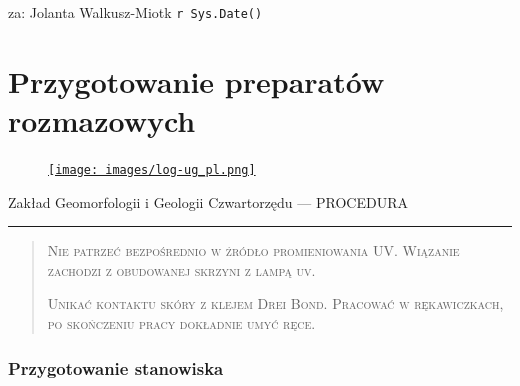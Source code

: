 \documentclass[
  letterpaper,
  DIV=11,
  numbers=noendperiod]{scrreprt}
\begin{document}
za: Jolanta Walkusz-Miotk \texttt{r\ Sys.Date()}

\hypertarget{przygotowanie-preparatuxf3w-rozmazowych}{%
\chapter{Przygotowanie preparatów
rozmazowych}\label{przygotowanie-preparatuxf3w-rozmazowych}}

\begin{figure}

\href{https://geomorfologia.ug.edu.pl}{\texttt{[image: images/log-ug\_pl.png]}}

\end{figure}

Zakład Geomorfologii i Geologii Czwartorzędu --- PROCEDURA

\begin{center}\rule{0.5\linewidth}{0.5pt}\end{center}

\begin{quote}
\textsc{Nie patrzeć bezpośrednio w źródło promieniowania UV. Wiązanie
zachodzi z obudowanej skrzyni z lampą uv.}

\textsc{Unikać kontaktu skóry z klejem Drei Bond. Pracować w
rękawiczkach, po skończeniu pracy dokładnie umyć ręce.}
\end{quote}

\hypertarget{przygotowanie-stanowiska-1}{%
\subsection{Przygotowanie stanowiska}\label{przygotowanie-stanowiska-1}}
\end{document}

